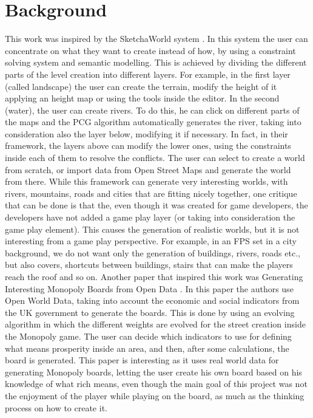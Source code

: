 \documentclass[conference]{IEEEtran}
\begin{document}
\section{Background}

This work was inspired by the SketchaWorld system \cite{sketchaworld}. In this system the user can concentrate on what they want to create instead of how, by using a constraint solving system and semantic modelling. This is achieved by dividing the different parts of the level creation into different layers. For example, in the first layer (called landscape) the user can create the terrain, modify the height of it applying an height map or using the tools inside the editor. In the second (water), the user can create rivers. To do this, he can click on different parts of the maps and the PCG algorithm automatically generates the river, taking into consideration also the layer below, modifying it if necessary. In fact, in their framework, the layers above can modify the lower ones, using the constraints inside each of them to resolve the conflicts. The user can select to create a world from scratch, or import data from Open Street Maps and generate the world from there. \newline\newline
While this framework can generate very interesting worlds, with rivers, mountains, roads and cities that are fitting nicely together, one critique that can be done is that the, even though it was created for game developers, the developers have not added a game play layer (or taking into consideration the game play element). This causes the generation of realistic worlds, but it is not interesting from a game play perspective. For example, in an FPS set in a city background, we do not want only the generation of buildings, rivers, roads etc., but also covers, shortcuts between buildings, stairs that can make the players reach the roof and so on.
\newline
\newline
Another paper that inspired this work was Generating Interesting Monopoly Boards from Open Data \cite{monopoly}. In this paper the authors use Open World Data, taking into account the economic and social indicators from the UK government to generate the boards. This is done by using an evolving algorithm in which the different weights are evolved  for the street creation inside the Monopoly game. The user can decide which indicators to use for defining what means prosperity inside an area, and then, after some calculations, the board is generated. This paper is interesting as it uses real world data for generating Monopoly boards, letting the user create his own board based on his knowledge of what rich means, even though the main goal of this project was not the enjoyment of the player while playing on the board, as much as the thinking process on how to create it.
\end{document}
